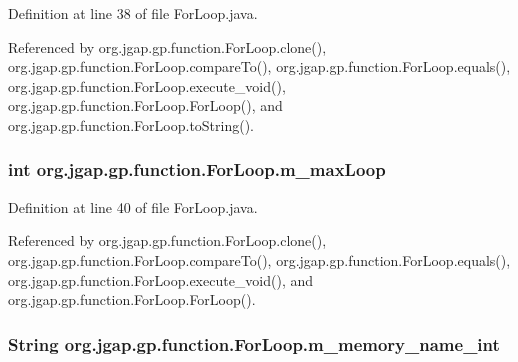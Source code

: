 Definition at line 38 of file For\-Loop.\-java.



Referenced by org.\-jgap.\-gp.\-function.\-For\-Loop.\-clone(), org.\-jgap.\-gp.\-function.\-For\-Loop.\-compare\-To(), org.\-jgap.\-gp.\-function.\-For\-Loop.\-equals(), org.\-jgap.\-gp.\-function.\-For\-Loop.\-execute\-\_\-void(), org.\-jgap.\-gp.\-function.\-For\-Loop.\-For\-Loop(), and org.\-jgap.\-gp.\-function.\-For\-Loop.\-to\-String().

\hypertarget{classorg_1_1jgap_1_1gp_1_1function_1_1_for_loop_afc96a0e9817af4047e8d0a6f8484ccb4}{
\subsubsection[{m\-\_\-max\-Loop}]{\setlength{\rightskip}{0pt plus 5cm}int org.\-jgap.\-gp.\-function.\-For\-Loop.\-m\-\_\-max\-Loop\hspace{0.3cm}{\ttfamily [private]}}}\label{classorg_1_1jgap_1_1gp_1_1function_1_1_for_loop_afc96a0e9817af4047e8d0a6f8484ccb4}


Definition at line 40 of file For\-Loop.\-java.



Referenced by org.\-jgap.\-gp.\-function.\-For\-Loop.\-clone(), org.\-jgap.\-gp.\-function.\-For\-Loop.\-compare\-To(), org.\-jgap.\-gp.\-function.\-For\-Loop.\-equals(), org.\-jgap.\-gp.\-function.\-For\-Loop.\-execute\-\_\-void(), and org.\-jgap.\-gp.\-function.\-For\-Loop.\-For\-Loop().

\hypertarget{classorg_1_1jgap_1_1gp_1_1function_1_1_for_loop_ab1eef316261cb5965f9e0a3c56e4b4a2}{
\subsubsection[{m\-\_\-memory\-\_\-name\-\_\-int}]{\setlength{\rightskip}{0pt plus 5cm}String org.\-jgap.\-gp.\-function.\-For\-Loop.\-m\-\_\-memory\-\_\-name\-\_\-int\hspace{0.3cm}{\ttfamily [private]}}}\label{classorg_1_1jgap_1_1gp_1_1function_1_1_for_loop_ab1eef316261cb5965f9e0a3c56e4b4a2}


